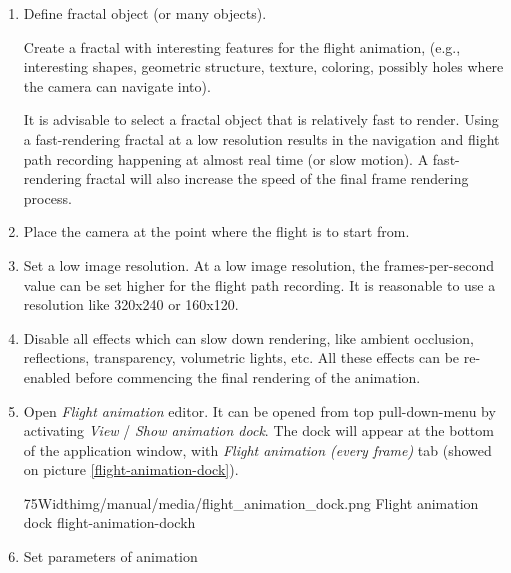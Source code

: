 \begin{enumerate}
	\item Define fractal object (or many objects). 
	
	Create a fractal with interesting features for the flight animation, (e.g., interesting shapes, geometric structure, texture, coloring, possibly holes where the camera can navigate into).
	
	It is advisable to select a fractal object that is relatively fast to render. Using a fast-rendering fractal at a low resolution results in the navigation and flight path recording happening at almost real time (or slow motion). A fast-rendering fractal will also increase the speed of the final frame rendering process.
	
	\item Place the camera at the point where the flight is to start from.
			
	\item Set a low image resolution. At a low image resolution, the frames-per-second value can be set higher for the flight path recording. It is reasonable to use a resolution like 320x240 or 160x120.
	
	\item Disable all effects which can slow down rendering, like ambient occlusion, reflections, transparency, volumetric lights, etc. All these effects can be re-enabled before commencing the final rendering of the animation.
	
	\item Open \emph{Flight animation} editor. It can be opened from top pull-down-menu by activating \emph{View} / \emph{Show animation dock}. The dock will appear at the bottom of the application window, with \emph{Flight animation (every frame)} tab (showed on picture \ref{flight-animation-dock}).
	
	\simpleImageWithCaption75Width{img/manual/media/flight_animation_dock.png}
	{Flight animation dock}
	{flight-animation-dock}{h}
	
	\item Set parameters of animation
	

\end{enumerate}
